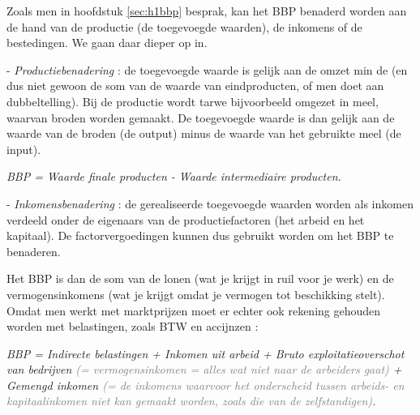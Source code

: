 Zoals men in hoofdstuk \ref{sec:h1bbp} besprak, kan het BBP benaderd worden aan de hand van de productie (de toegevoegde waarden), de inkomens of de bestedingen. We gaan daar dieper op in. \\

\par - \textit{Productiebenadering} : de toegevoegde waarde is gelijk aan de omzet min de  (en dus niet gewoon de som van de waarde van eindproducten, of men doet aan dubbeltelling). Bij de productie wordt tarwe bijvoorbeeld omgezet in meel, waarvan broden worden gemaakt. De toegevoegde waarde is dan gelijk aan de waarde van de broden (de output) minus de waarde van het gebruikte meel (de input).\\

\begin{leftbar}\noindent\textit{BBP = Waarde finale producten - Waarde intermediaire producten.}\end{leftbar}

\par - \textit{Inkomensbenadering} : de gerealiseerde toegevoegde waarden worden als inkomen verdeeld onder de eigenaars van de productiefactoren (het arbeid en het kapitaal). De factorvergoedingen kunnen dus gebruikt worden om het BBP te benaderen. 
\par Het BBP is dan de som van de lonen (wat je krijgt in ruil voor je werk) en de vermogensinkomens (wat je krijgt omdat je vermogen tot beschikking stelt). Omdat men werkt met marktprijzen moet er echter ook rekening gehouden worden met belastingen, zoals BTW en accijnzen :

\begin{leftbar}\noindent\textit{BBP = Indirecte belastingen + Inkomen uit arbeid + Bruto exploitatieoverschot van bedrijven \textcolor{gray}{(= vermogensinkomen = alles wat niet naar de arbeiders gaat)} + Gemengd inkomen \textcolor{gray}{(= de inkomens waarvoor het onderscheid tussen arbeids- en kapitaalinkomen niet kan gemaakt worden, zoals die van de zelfstandigen)}.}\end{leftbar}

